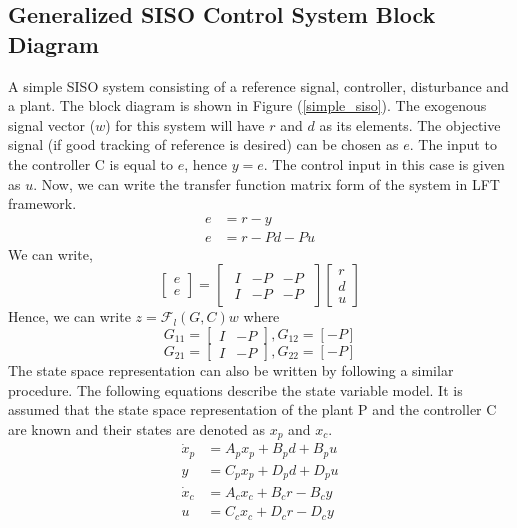 \documentclass[a4paper,12pt]{article}
\begin{document}
			\subsection{Generalized SISO Control System Block Diagram} A simple SISO system consisting of a reference signal, controller, disturbance and a plant. The block diagram is shown in Figure (\ref{simple_siso}). The exogenous signal vector ($w$) for this system will have $r$ and $d$ as its elements. The objective signal (if good tracking of reference is desired) can be chosen as $e$. The input to the controller C is equal to $e$, hence $y=e$. The control input in this case is given as $u$. Now, we can write the transfer function matrix form of the system in LFT framework. 
				\begin{align}
					e&=r-y\\
					e&=r-Pd-Pu
				\end{align}	
				We can write,
				\[
				\begin{bmatrix}
				e\\ \hline e 
				\end{bmatrix}				
				=
				\begin{bmatrix}
				\begin{array}{cc|c}
				I & -P & -P\\
				\hline
				I & -P & -P
				\end{array}
				\end{bmatrix}
				\begin{bmatrix}
				r\\d\\ \hline u
				\end{bmatrix}
				\]
				Hence, we can write $z=\mathscr{F}_{l}(G,C)w$ where \[G_{11} =\begin{bmatrix}
				I & -P
				\end{bmatrix}, G_{12}=[-P]\] \[G_{21} =\begin{bmatrix}
				I & -P
				\end{bmatrix}, G_{22}=[-P]\] 
				The state space representation can also be written by following a similar procedure. The following equations describe the state variable model. It is assumed that the state space representation of the plant P and the controller C are known and their states are denoted as $x_{p}$ and $x_{c}$.
				\begin{align}
				\dot{x}_{p}&=A_{p}x_{p}+B_{p}d+B_{p}u\\
				y&=C_{p}x_{p}+D_{p}d+D_{p}u\\
				\dot{x}_{c}&=A_{c}x_{c}+B_{c}r-B_{c}y\\
				u&=C_{c}x_{c}+D_{c}r-D_{c}y				
				\end{align}
\end{document}
